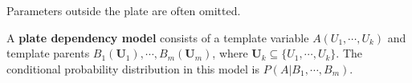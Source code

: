 \documentclass[11pt]{article}
\begin{document}
	
	\begin{remark}
		Parameters outside the plate are often omitted.
	\end{remark}
	
	\begin{example}
		
	\end{example}
	
	\begin{example}
		
	\end{example}
	
	\begin{example}
		
	\end{example}
	
	\begin{definition}
		A \textbf{plate dependency model} consists of a template variable $A(U_1, \cdots, U_k)$ and template parents $B_1(\textbf{U}_1), \cdots, B_m(\textbf{U}_m)$, where $\textbf{U}_k \subseteq \{U_1, \cdots, U_k\}$. The conditional probability distribution in this model is $P(A|B_1, \cdots, B_m)$.
	\end{definition}
\end{document}
